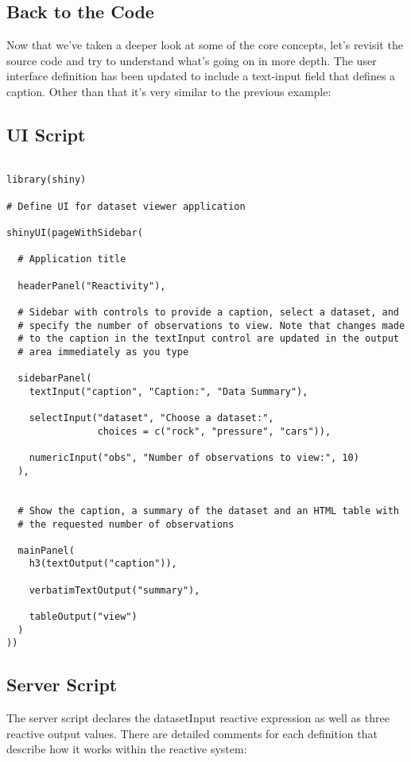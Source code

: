 \documentclass[a4paper,12pt]{article}
\begin{document}
\subsection*{Back to the Code}
Now that we’ve taken a deeper look at some of the core concepts, let’s revisit the source code and try to understand what’s going on in more depth. The user interface definition has been updated to include a text-input field that defines a caption. Other than that it’s very similar to the previous example:
\newpage
\subsection*{UI Script}
\begin{framed}
\begin{verbatim}

library(shiny)

# Define UI for dataset viewer application

shinyUI(pageWithSidebar(

  # Application title
  
  headerPanel("Reactivity"),

  # Sidebar with controls to provide a caption, select a dataset, and 
  # specify the number of observations to view. Note that changes made
  # to the caption in the textInput control are updated in the output
  # area immediately as you type
  
  sidebarPanel(
    textInput("caption", "Caption:", "Data Summary"),

    selectInput("dataset", "Choose a dataset:", 
                choices = c("rock", "pressure", "cars")),

    numericInput("obs", "Number of observations to view:", 10)
  ),


  # Show the caption, a summary of the dataset and an HTML table with
  # the requested number of observations
  
  mainPanel(
    h3(textOutput("caption")), 

    verbatimTextOutput("summary"), 

    tableOutput("view")
  )
))
\end{verbatim}
\end{framed}
\newpage
\subsection*{Server Script}
The server script declares the datasetInput reactive expression as well as three reactive output values. There are detailed comments for each definition that describe how it works within the reactive system:
\end{document}
